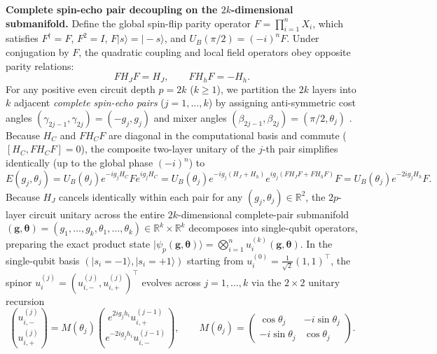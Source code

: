\documentclass[10pt,a4paper]{article}
\begin{document}
\textbf{Complete spin-echo pair decoupling on the $2k$-dimensional submanifold.} Define the global spin-flip parity operator $F = \prod_{i=1}^n X_i$, which satisfies $F^\dagger = F$, $F^2 = I$, $F|s\rangle = |-s\rangle$, and $U_B(\pi/2) = (-i)^n F$. Under conjugation by $F$, the quadratic coupling and local field operators obey opposite parity relations:
\[
F H_J F = H_J, \qquad F H_h F = -H_h.
\]
For any positive even circuit depth $p = 2k$ ($k \ge 1$), we partition the $2k$ layers into $k$ adjacent \emph{complete spin-echo pairs} ($j = 1, \ldots, k$) by assigning anti-symmetric cost angles $(\gamma_{2j-1}, \gamma_{2j}) = (-g_j, g_j)$ and mixer angles $(\beta_{2j-1}, \beta_{2j}) = (\pi/2, \theta_j)$ \citep{yao2026echo}. Because $H_C$ and $F H_C F$ are diagonal in the computational basis and commute ($[H_C, F H_C F] = 0$), the composite two-layer unitary of the $j$-th pair simplifies identically (up to the global phase $(-i)^n$) to
\[
E(g_j, \theta_j) = U_B(\theta_j) e^{-i g_j H_C} F e^{i g_j H_C} = U_B(\theta_j) e^{-i g_j (H_J + H_h)} e^{i g_j (F H_J F + F H_h F)} F = U_B(\theta_j) e^{-2i g_j H_h} F.
\]
Because $H_J$ cancels identically within each pair for any $(g_j, \theta_j) \in \mathbb{R}^2$, the $2p$-layer circuit unitary across the entire $2k$-dimensional complete-pair submanifold $(\boldsymbol{g}, \boldsymbol{\theta}) = (g_1, \ldots, g_k, \theta_1, \ldots, \theta_k) \in \mathbb{R}^k \times \mathbb{R}^k$ decomposes into single-qubit operators, preparing the exact product state $|\psi_p(\boldsymbol{g}, \boldsymbol{\theta})\rangle = \bigotimes_{i=1}^n u_i^{(k)}(\boldsymbol{g}, \boldsymbol{\theta})$. In the single-qubit basis $(|s_i = -1\rangle, |s_i = +1\rangle)$ starting from $u_i^{(0)} = \frac{1}{\sqrt{2}}(1, 1)^\top$, the spinor $u_i^{(j)} = (u_{i,-}^{(j)}, u_{i,+}^{(j)})^\top$ evolves across $j = 1, \ldots, k$ via the $2 \times 2$ unitary recursion
\[
\binom{u_{i,-}^{(j)}}{u_{i,+}^{(j)}} = M(\theta_j)\binom{e^{2i g_j h_i} u_{i,+}^{(j-1)}}{e^{-2i g_j h_i} u_{i,-}^{(j-1)}}, \qquad M(\theta_j) = \begin{pmatrix} \cos\theta_j & -i\sin\theta_j \\ -i\sin\theta_j & \cos\theta_j \end{pmatrix}.
\]
\end{document}

